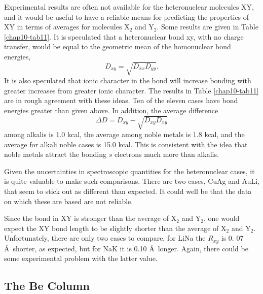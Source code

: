 Experimental results are often not available for the heteronuclear
molecules XY, and it would be useful to have a reliable means for
predicting the properties of XY in terms of averages for molecules
X$_2$ and Y$_2$. Some results are given in Table \ref{chap10-tab11}.
It is speculated that a heteronuclear bond xy, with no charge
transfer, would be equal to the geometric mean of the homonuclear bond
energies,
\begin{equation}
D_{xy} = \sqrt{D_{xx} D_{yy}} .
\end{equation}
It is also speculated that ionic character in the bond will increase
bonding with greater increases from greater ionic character.  The
results in Table \ref{chap10-tab11} are in rough agreement with these
ideas.  Ten of the eleven cases have bond energies greater than given
above.  In addition, the average difference
\begin{equation}
\Delta D = D_{xy} - \sqrt{D_{xy} D_{xy}}
\end{equation}
among alkalis is 1.0 kcal, the average among noble metals is 1.8
kcal, and the average for alkali noble cases is 15.0 kcal.  This 
is consistent with the idea that noble metals attract the bonding 
$s$ electrons much more than alkalis.
 
Given the uncertainties in spectroscopic quantities for the 
heteronuclear cases, it is quite valuable to make such 
comparisons. There are two cases, CuAg and AuLi, that 
seem to stick out as different than expected.  It could 
well be that the data on which these are based are not reliable.

Since the bond in XY is stronger than the average of X$_2$ and Y$_2$, one
would expect the XY bond length to be slightly shorter than the average of
X$_2$ and Y$_2$.  Unfortunately, there are only two cases to compare, for 
LiNa the $R_{xy}$ is 0. 07 \AA\ shorter, as expected, but for NaK it is 
0.10 \AA\ longer.  Again,
there could be some experimental problem with the latter value.

\subsection{The Be Column}


